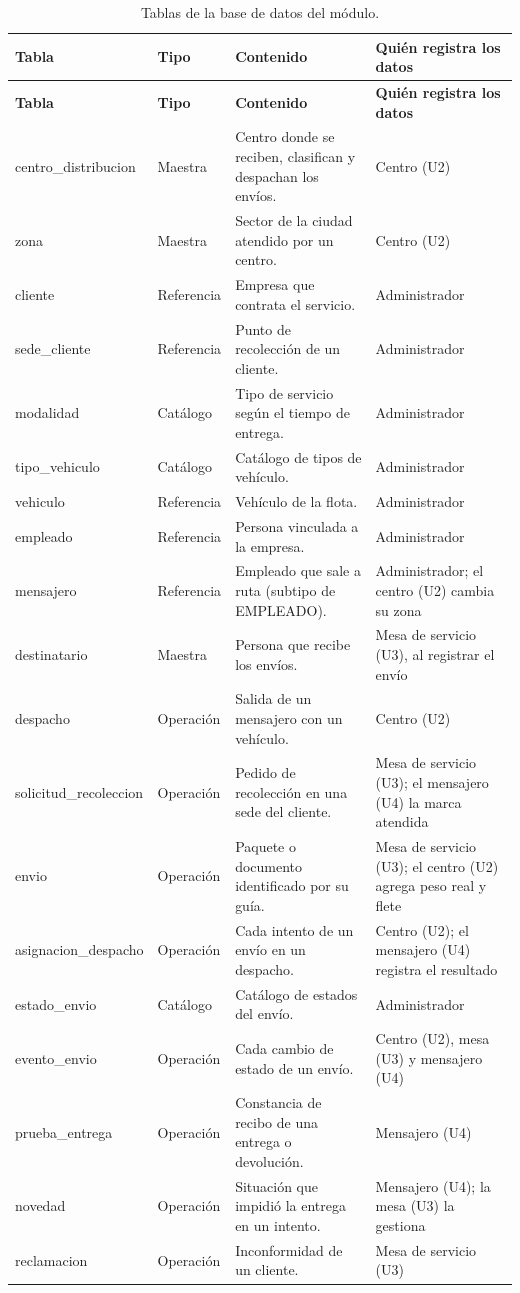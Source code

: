 {\singlespacing\small
\begin{longtable}{L{3.6cm} L{1.8cm} L{5.0cm} L{4.0cm}}
\caption{Tablas de la base de datos del módulo.}
\label{tab:tablas6}\\
\toprule
\textbf{Tabla} & \textbf{Tipo} & \textbf{Contenido} & \textbf{Quién registra los datos} \\
\midrule
\endfirsthead
\toprule
\textbf{Tabla} & \textbf{Tipo} & \textbf{Contenido} & \textbf{Quién registra los datos} \\
\midrule
\endhead
\bottomrule
\endfoot
centro\_distribucion & Maestra & Centro donde se reciben, clasifican y despachan los envíos. & Centro (U2) \\
zona & Maestra & Sector de la ciudad atendido por un centro. & Centro (U2) \\
cliente & Referencia & Empresa que contrata el servicio. & Administrador \\
sede\_cliente & Referencia & Punto de recolección de un cliente. & Administrador \\
modalidad & Catálogo & Tipo de servicio según el tiempo de entrega. & Administrador \\
tipo\_vehiculo & Catálogo & Catálogo de tipos de vehículo. & Administrador \\
vehiculo & Referencia & Vehículo de la flota. & Administrador \\
empleado & Referencia & Persona vinculada a la empresa. & Administrador \\
mensajero & Referencia & Empleado que sale a ruta (subtipo de EMPLEADO). & Administrador; el centro (U2) cambia su zona \\
destinatario & Maestra & Persona que recibe los envíos. & Mesa de servicio (U3), al registrar el envío \\
despacho & Operación & Salida de un mensajero con un vehículo. & Centro (U2) \\
solicitud\_recoleccion & Operación & Pedido de recolección en una sede del cliente. & Mesa de servicio (U3); el mensajero (U4) la marca atendida \\
envio & Operación & Paquete o documento identificado por su guía. & Mesa de servicio (U3); el centro (U2) agrega peso real y flete \\
asignacion\_despacho & Operación & Cada intento de un envío en un despacho. & Centro (U2); el mensajero (U4) registra el resultado \\
estado\_envio & Catálogo & Catálogo de estados del envío. & Administrador \\
evento\_envio & Operación & Cada cambio de estado de un envío. & Centro (U2), mesa (U3) y mensajero (U4) \\
prueba\_entrega & Operación & Constancia de recibo de una entrega o devolución. & Mensajero (U4) \\
novedad & Operación & Situación que impidió la entrega en un intento. & Mensajero (U4); la mesa (U3) la gestiona \\
reclamacion & Operación & Inconformidad de un cliente. & Mesa de servicio (U3) \\
\end{longtable}
\par}

